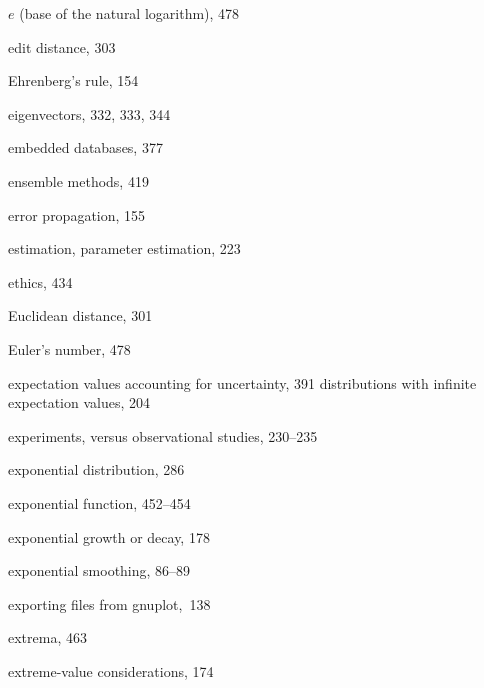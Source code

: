 \documentclass{Oreilly5980006}
\begin{document}
\begin{theindex}
  \item $e$ (base of the natural logarithm), 478
  \item edit distance, 303
  \item Ehrenberg's rule, 154
  \item eigenvectors, 332, 333, 344
  \item embedded databases, 377
  \item ensemble methods, 419
  \item error propagation, 155
  \item estimation, parameter estimation, 223
  \item ethics, 434
  \item Euclidean distance, 301
  \item Euler's number, 478
  \item expectation values
    \subitem accounting for uncertainty, 391
    \subitem distributions with infinite expectation values, 204
  \item experiments, versus observational studies, 230--235
  \item exponential distribution, 286
  \item exponential function, 452--454
  \item exponential growth or decay, 178
  \item exponential smoothing, 86--89
  \item exporting files from gnuplot,~138
  \item extrema, 463
  \item extreme-value considerations, 174\vspace*{-5pt}

  \indexspace


\end{theindex}
\end{document}
